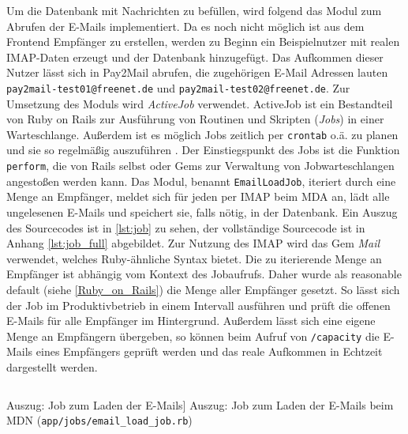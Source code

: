 Um die Datenbank mit Nachrichten zu befüllen, wird folgend das Modul zum Abrufen der E-Mails implementiert. Da es noch nicht möglich ist aus dem Frontend Empfänger zu erstellen, werden zu Beginn ein Beispielnutzer mit realen IMAP-Daten erzeugt und der Datenbank hinzugefügt. Das Aufkommen dieser Nutzer lässt sich in Pay2Mail abrufen, die zugehörigen E-Mail Adressen lauten \texttt{pay2mail-test01@freenet.de} und \texttt{pay2mail-test02@freenet.de}. Zur Umsetzung des Moduls wird \textit{ActiveJob} verwendet. ActiveJob ist ein Bestandteil von Ruby on Rails zur Ausführung von Routinen und Skripten (\textit{Jobs}) in einer Warteschlange. Außerdem ist es möglich Jobs zeitlich per \texttt{crontab} o.ä. zu planen und sie so regelmäßig auszuführen \citep{Hansson2022b}. Der Einstiegspunkt des Jobs ist die Funktion \texttt{perform}, die von Rails selbst oder Gems zur Verwaltung von Jobwarteschlangen angestoßen werden kann. Das Modul, benannt \texttt{EmailLoadJob}, iteriert durch eine Menge an Empfänger, meldet sich für jeden per IMAP beim MDA an, lädt alle ungelesenen E-Mails und speichert sie, falls nötig, in der Datenbank. Ein Auszug des Sourcecodes ist in \ref{lst:job} zu sehen, der vollständige Sourcecode ist in Anhang \ref{lst:job_full} abgebildet. Zur Nutzung des IMAP wird das Gem \textit{Mail} verwendet, welches Ruby-ähnliche Syntax bietet. Die zu iterierende Menge an Empfänger ist abhängig vom Kontext des Jobaufrufs. Daher wurde als reasonable default (siehe \ref{Ruby_on_Rails}) die Menge aller Empfänger gesetzt. So lässt sich der Job im Produktivbetrieb in einem Intervall ausführen und prüft die offenen E-Mails für alle Empfänger im Hintergrund. Außerdem lässt sich eine eigene Menge an Empfängern übergeben, so können beim Aufruf von \texttt{/capacity} die E-Mails eines Empfängers geprüft werden und das reale Aufkommen in Echtzeit dargestellt werden.

\begin{listing}[!ht]
\inputminted[firstline=4, lastline=11,linenos]{ruby}{Listings/Pkg1/email_load_job.rb}

\caption
    [Auszug: Job zum Laden der E-Mails]
    {Auszug: Job zum Laden der E-Mails beim MDN (\texttt{app/jobs/email\_load\_job.rb})}

\label{lst:job}
\end{listing}

